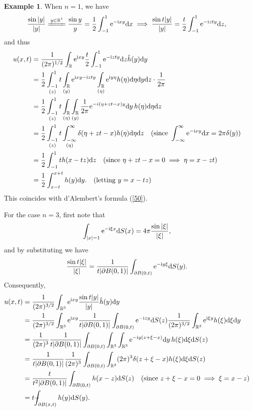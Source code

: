 \documentclass[hyperref,UTF8,12pt]{article}
\numberwithin{equation}{subsection}
\theoremstyle{plain}
\theoremstyle{definition}
\newtheorem{example}{Example}
\numberwithin{theorem}{section}
\numberwithin{lemma}{section}
\numberwithin{proposition}{section}
\numberwithin{remark}{section}
\numberwithin{corollary}{section}
\numberwithin{definition}{section}
\numberwithin{problem}{section}
\numberwithin{example}{section}
\def\e{\textup{e}}
\def\i{\textup{i}}
\def\dif{\textup{d}}
\def\Xint#1{\mathchoice
	{\XXint\displaystyle\textstyle{#1}}%
	{\XXint\textstyle\scriptstyle{#1}}%
	{\XXint\scriptstyle\scriptscriptstyle{#1}}%
	{\XXint\scriptscriptstyle\scriptscriptstyle{#1}}%
	\!\int}
\def\XXint#1#2#3{{\setbox0=\hbox{$#1{#2#3}{\int}$ }
		\vcenter{\hbox{$#2#3$ }}\kern-.55\wd0}}
\def\dashint{\Xint-}
\newcommand{\ptl}{\partial}
\newcommand{\mr}{\mathbb{R}}
\begin{document}
\begin{example}
When $n=1$, we have\[\frac{\sin|y|}{|y|}\xlongequal{y\in\mr^1}\frac{\sin y}
{y}=\frac{1}{2}\int_{-1}^1\e^{-\i xy}\dif x\implies\frac{\sin t|y|}{|y|}=\frac{t}{2} \int_{-1}^1\e^{-\i zty}\dif z,\] and thus\[\begin{aligned}
u(x,t)&=\frac{1}{(2\pi)^{1/2}}\int_\mr\e^{\i xy}\frac{t}{2}\int_{-1}^1\e^{-\i zty}\dif z\hat{h}(y)\dif y\\
&=\frac{1}{2}\mathop{\int_{-1}^1}_{(z)}t\mathop{\int_\mr}_{(y)}\e^{\i xy-\i zty}\mathop{\int_\mr}_{(\eta)}\e^{\i y\eta}h(\eta)\dif\eta\dif y\dif z\cdot\frac{1} {2\pi}\\
&=\frac{1}{2}\mathop{\int_{-1}^1}_{(z)}t\mathop{\int_\mr}_{(\eta)}\mathop{\int_\mr}_{(y)}\frac{1}{2\pi}\e^{-i(\eta+zt-x)y}\dif y\,h(\eta)\dif\eta\dif z\\
&=\frac{1}{2}\mathop{\int_{-1}^1}_{(z)}t\mathop{\int_{-\infty}^\infty}_{(\eta)}\delta(\eta+zt-x)h(\eta)\dif\eta\dif z\quad(\text{since } \int_{-\infty}^\infty\e^{-\i xy}\dif x=2\pi\delta(y))\\
&=\frac{1}{2}\int_{-1}^1th(x-tz)\dif z\quad(\text{since } \eta+zt-x=0\implies\eta=x-zt)\\
&=\frac{1}{2}\int_{x-t}^{x+t}h(y)\dif y.\quad(\text{letting } y=x-tz)
\end{aligned}\]This coincides with d'Alembert's formula (\ref{50}).

For the case $n=3$, first note that \[\int_{|x|=1}\e^{-\i\xi x}\dif S(x)=4\pi\frac{\sin|\xi|} {|\xi|},\]and by substituting we have \[\frac{\sin t|\xi|}{|\xi|}=\frac{1}{t|\ptl B(0,1)|}
\int_{\ptl B(0,t)}\e^{-\i y \xi}\dif S(y).\]Consequently, \[\begin{aligned}
u(x,t)&=\frac{1}{(2\pi)^{3/2}}\int_{\mr^3}\e^{\i xy}\frac{\sin t|y|}{|y|}\hat{h}(y)\dif y\\
&=\frac{1}{(2\pi)^{3/2}}\int_{\mr^3}\e^{\i xy}\frac{1}{t|\ptl B(0,1)|}\int_{\ptl B(0,t)} \e^{-\i zy}\dif S(z)\frac{1}{(2\pi)^{3/2}}\int_{\mr^3}\e^{\i\xi y}h(\xi)\dif\xi\dif y\\
&=\frac{1}{(2\pi)^3}\frac{1}{t|\ptl B(0,1)|}\int_{\ptl B(0,t)}\int_{\mr^3}\int_{\mr^3}\e ^{-\i y(z+\xi-x)}\dif y\,h(\xi)\dif\xi\dif S(z)\\
&=\frac{1}{t|\ptl B(0,1)|}\frac{1}{(2\pi)^3}\int_{\ptl B(0,t)}\int_{\mr^3}(2\pi)^3\delta (z+\xi-x)h(\xi)\dif\xi\dif S(z)\\
&=\frac{t}{t^2|\ptl B(0,1)|}\int_{\ptl B(0,t)}h(x-z)\dif S(z)\quad(\text{since } z+\xi-x=0\implies\xi=x-z)\\
&=t\dashint_{\ptl B(x,t)}h(y)\dif S(y).
\end{aligned}\]
\end{example}
\end{document}
